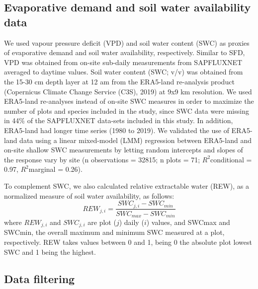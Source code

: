 \documentclass[11pt,twoside]{reedthesis}
\begin{document}
\subsection{Evaporative demand and soil water availability
data}\label{evaporative-demand-and-soil-water-availability-data}

We used vapour pressure deficit (VPD) and soil water content (SWC) as
proxies of evaporative demand and soil water availability, respectively.
Similar to SFD, VPD was obtained from on-site sub-daily measurements
from SAPFLUXNET averaged to daytime values. Soil water content (SWC;
v/v) was obtained from the 15-30 cm depth layer at 12 am from the
ERA5-land re-analysis product (Copernicus Climate Change Service (C3S),
2019) at 9x9 km resolution. We used ERA5-land re-analyses instead of
on-site SWC measures in order to maximize the number of plots and
species included in the study, since SWC data were missing in 44\% of
the SAPFLUXNET data-sets included in this study. In addition, ERA5-land
had longer time series (1980 to 2019). We validated the use of ERA5-land
data using a linear mixed-model (LMM) regression between ERA5-land and
on-site shallow SWC measurements by letting random intercepts and slopes
of the response vary by site (n observations = 32815; n plots = 71;
\(R^2\)conditional = 0.97, \(R^2\)marginal = 0.26).\par

To complement SWC, we also calculated relative extractable water (REW),
as a normalized measure of soil water availability, as follows:
\begin{equation}
REW_{j,i} = \frac{SWC_{j,i} - SWC_{min}}{SWC_{max} - SWC_{min}}
\end{equation}
where \(REW_{j,i}\) and \(SWC_{j,i}\) are plot (\(j\)) daily (\(i\))
values, and SWCmax and SWCmin, the overall maximum and minimum SWC
measured at a plot, respectively. REW takes values between 0 and 1,
being 0 the absolute plot lowest SWC and 1 being the highest.\par

\subsection{Data filtering}\label{data-filtering}
\end{document}
